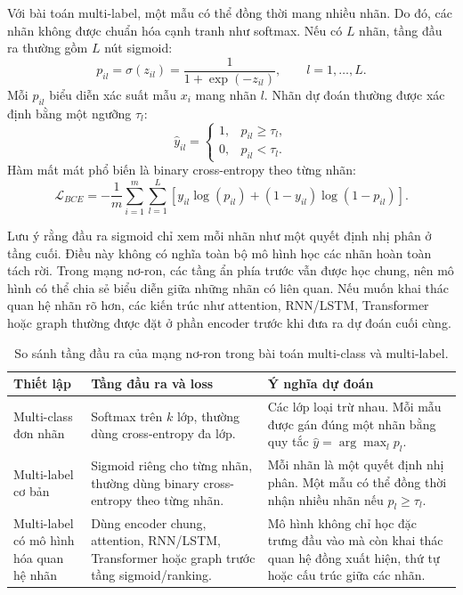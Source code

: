 Với bài toán multi-label, một mẫu có thể đồng thời mang nhiều nhãn. Do đó, các nhãn
không được chuẩn hóa cạnh tranh như softmax. Nếu có $L$ nhãn, tầng đầu ra thường
gồm $L$ nút sigmoid:
\[
    p_{il}
    =
    \sigma(z_{il})
    =
    \frac{1}{1+\exp(-z_{il})},
    \qquad l=1,\ldots,L.
\]
Mỗi $p_{il}$ biểu diễn xác suất mẫu $x_i$ mang nhãn $l$. Nhãn dự đoán thường được
xác định bằng một ngưỡng $\tau_l$:
\[
    \hat{y}_{il}
    =
    \begin{cases}
    1, & p_{il}\geq \tau_l,\\
    0, & p_{il}<\tau_l.
    \end{cases}
\]
Hàm mất mát phổ biến là binary cross-entropy theo từng nhãn:
\[
    \mathcal{L}_{BCE}
    =
    -\frac{1}{m}
    \sum_{i=1}^{m}
    \sum_{l=1}^{L}
    \left[
    y_{il}\log(p_{il})
    +
    (1-y_{il})\log(1-p_{il})
    \right].
\]

Lưu ý rằng đầu ra sigmoid chỉ xem mỗi nhãn như một quyết định nhị phân ở tầng
cuối. Điều này không có nghĩa toàn bộ mô hình học các nhãn hoàn toàn tách rời. Trong
mạng nơ-ron, các tầng ẩn phía trước vẫn được học chung, nên mô hình có thể chia sẻ
biểu diễn giữa những nhãn có liên quan. Nếu muốn khai thác quan hệ nhãn rõ hơn,
các kiến trúc như attention, RNN/LSTM, Transformer hoặc graph thường được đặt ở
phần encoder trước khi đưa ra dự đoán cuối cùng.

\begin{table}[htbp]
\centering
\small
\renewcommand{\arraystretch}{1.25}
\begin{tabular}{p{} p{} p{}}
\hline
\textbf{Thiết lập}
& \textbf{Tầng đầu ra và loss}
& \textbf{Ý nghĩa dự đoán} \\
\hline

Multi-class đơn nhãn
&
Softmax trên $k$ lớp, thường dùng cross-entropy đa lớp.
&
Các lớp loại trừ nhau. Mỗi mẫu được gán đúng một nhãn bằng quy tắc
$\hat{y}=\arg\max_l p_l$. \\

\hline

Multi-label cơ bản
&
Sigmoid riêng cho từng nhãn, thường dùng binary cross-entropy theo từng nhãn.
&
Mỗi nhãn là một quyết định nhị phân. Một mẫu có thể đồng thời nhận nhiều nhãn
nếu $p_l \geq \tau_l$. \\

\hline

Multi-label có mô hình hóa quan hệ nhãn
&
Dùng encoder chung, attention, RNN/LSTM, Transformer hoặc graph trước tầng
sigmoid/ranking.
&
Mô hình không chỉ học đặc trưng đầu vào mà còn khai thác quan hệ đồng xuất hiện,
thứ tự hoặc cấu trúc giữa các nhãn. \\

\hline
\end{tabular}
\caption{So sánh tầng đầu ra của mạng nơ-ron trong bài toán multi-class và multi-label.}
\label{tab:dl_output_layer}
\end{table}

